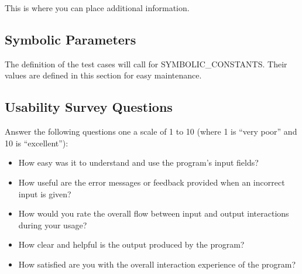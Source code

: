 \documentclass[12pt, titlepage]{article}
\begin{document}
This is where you can place additional information.

\subsection{Symbolic Parameters}

The definition of the test cases will call for SYMBOLIC\_CONSTANTS.
Their values are defined in this section for easy maintenance.

\subsection{Usability Survey Questions} \label{use_survey}
Answer the following questions one a scale of 1 to 10 (where 1 is ``very poor'' and 10 is ``excellent''):
\begin{itemize}
  \item How easy was it to understand and use the program's input fields?
  \item How useful are the error messages or feedback provided when an incorrect input is given?
  \item How would you rate the overall flow between input and output interactions during your usage?
  \item How clear and helpful is the output produced by the program?
  \item How satisfied are you with the overall interaction experience of the program?
\end{itemize}
\end{document}
